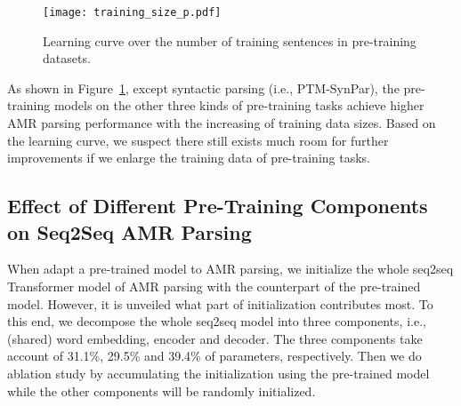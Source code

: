 \documentclass[11pt,a4paper]{article}
\newcommand{\ignore}[1]{}
\begin{document}
\begin{figure}[]
\begin{center}
\texttt{[image: training\_size\_p.pdf]}
\end{center}
\caption{Learning curve over the number of training sentences in pre-training datasets.} 
\label{fig:curve}
\end{figure}

As shown in Figure~\ref{fig:curve}, except syntactic parsing (i.e., PTM-SynPar), the pre-training models on the other three kinds of pre-training tasks achieve higher AMR parsing performance with the increasing of training data sizes. Based on the learning curve, we suspect there still exists much room for further improvements if we enlarge the training data of pre-training tasks.



\ignore{
\subsection{Effect of Sentence Lengths}

\begin{figure}[]
\begin{center}
\texttt{[image: sentence\_length.pdf]}
\end{center}
\caption{AMR Parsing performance with respect to the lengths of the sentences.} 
\label{fig:sent_len}
\end{figure}

In order to explore the effect of sentence lengths on AMR parsing performance, we divide the test set into 6 groups according to the sentence lengths and evaluate
their performance on five different pre-trained seq2seq models respectively. As shown in Figure~\ref{fig:sent_len}, our pre-trained models significantly outperform the baseline over all sentence lengths. We also notice that the performance of models gradually decreases when the sentence length becomes longer. We think that AMR graphs of long sentences are more likely to have entities and reentrancies, which makes the parsing more challenging.
}

\subsection{Effect of Different Pre-Training Components on Seq2Seq AMR Parsing}
When adapt a pre-trained model to AMR parsing, we initialize the whole seq2seq Transformer model of AMR parsing with the counterpart of the pre-trained model. However, it is unveiled what part of initialization contributes most. To this end, we decompose the whole seq2seq model into three components, i.e., (shared) word embedding, encoder and decoder. The three components take account of 31.1\%, 29.5\% and 39.4\%  of parameters, respectively. Then we do ablation study by accumulating the initialization using the pre-trained model while the other components will be randomly initialized. 
\end{document}
